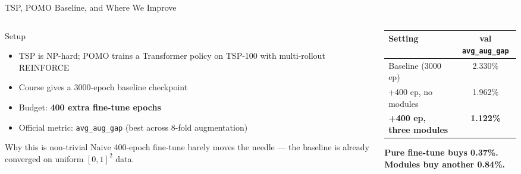 \documentclass[aspectratio=169,11pt]{beamer}
\begin{document}
\begin{frame}{TSP, POMO Baseline, and Where We Improve}
  \begin{columns}[T,totalwidth=\textwidth]
    \begin{column}{0.55\textwidth}
      \begin{block}{Setup}
        \begin{itemize}
          \item TSP is NP-hard; POMO trains a Transformer policy on TSP-100
                with multi-rollout REINFORCE
          \item Course gives a 3000-epoch baseline checkpoint
          \item Budget: \textbf{400 extra fine-tune epochs}
          \item Official metric: \texttt{avg\_aug\_gap}
                (best across 8-fold augmentation)
        \end{itemize}
      \end{block}
      \begin{block}{Why this is non-trivial}
        Naive 400-epoch fine-tune barely moves the needle ---
        the baseline is already converged on uniform $[0,1]^2$ data.
      \end{block}
    \end{column}
    \begin{column}{0.42\textwidth}
      \centering
      \begin{tabular}{lc}
        \toprule
        \textbf{Setting} & \textbf{val \texttt{avg\_aug\_gap}} \\
        \midrule
        Baseline (3000 ep) & 2.330\% \\
        +400 ep, no modules & 1.962\% \\
        \rowcolor{sdmblue!12}
        \textbf{+400 ep, three modules} & \textbf{1.122\%} \\
        \bottomrule
      \end{tabular}
      \vspace{0.4cm}

      {\color{sdmorange}\textbf{Pure fine-tune buys 0.37\%.}}\\
      {\color{sdmblue}\textbf{Modules buy another 0.84\%.}}
    \end{column}
  \end{columns}
\end{frame}
\end{document}
